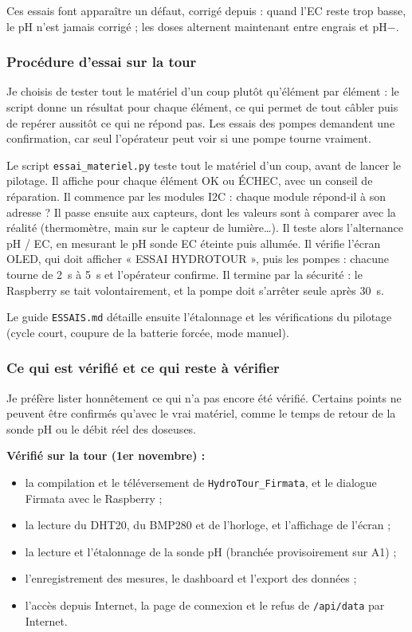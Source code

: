 Ces essais font apparaître un défaut, corrigé depuis : quand l'EC reste trop basse, le pH n'est jamais corrigé ; les doses alternent maintenant entre engrais et pH$-$.

\subsubsection*{Procédure d'essai sur la tour}

Je choisis de tester tout le matériel d'un coup plutôt qu'élément par élément : le script donne un résultat pour chaque élément, ce qui permet de tout câbler puis de repérer aussitôt ce qui ne répond pas. Les essais des pompes demandent une confirmation, car seul l'opérateur peut voir si une pompe tourne vraiment.

Le script \texttt{essai\_materiel.py} teste tout le matériel d'un coup, avant de lancer le pilotage. Il affiche pour chaque élément OK ou ÉCHEC, avec un conseil de réparation. Il commence par les modules I2C : chaque module répond-il à son adresse ? Il passe ensuite aux capteurs, dont les valeurs sont à comparer avec la réalité (thermomètre, main sur le capteur de lumière\ldots). Il teste alors l'alternance pH / EC, en mesurant le pH sonde EC éteinte puis allumée. Il vérifie l'écran OLED, qui doit afficher « ESSAI HYDROTOUR », puis les pompes : chacune tourne de \qty{2}{s} à \qty{5}{s} et l'opérateur confirme. Il termine par la sécurité : le Raspberry se tait volontairement, et la pompe doit s'arrêter seule après \qty{30}{s}.

Le guide \texttt{ESSAIS.md} détaille ensuite l'étalonnage et les vérifications du pilotage (cycle court, coupure de la batterie forcée, mode manuel).

\subsubsection*{Ce qui est vérifié et ce qui reste à vérifier}

Je préfère lister honnêtement ce qui n'a pas encore été vérifié. Certains points ne peuvent être confirmés qu'avec le vrai matériel, comme le temps de retour de la sonde pH ou le débit réel des doseuses.

\textbf{Vérifié sur la tour (1er novembre) :}

\begin{itemize}
\item la compilation et le téléversement de \texttt{HydroTour\_Firmata}, et le dialogue Firmata avec le Raspberry ;
\item la lecture du DHT20, du BMP280 et de l'horloge, et l'affichage de l'écran ;
\item la lecture et l'étalonnage de la sonde pH (branchée provisoirement sur A1) ;
\item l'enregistrement des mesures, le dashboard et l'export des données ;
\item l'accès depuis Internet, la page de connexion et le refus de \texttt{/api/data} par Internet.
\end{itemize}

